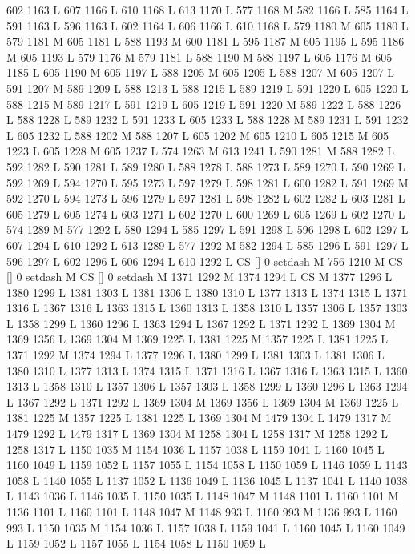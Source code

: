 {{{{{{{{{{{{{{{{{{602 1163 L
607 1166 L
610 1168 L
613 1170 L
577 1168 M 582 1166 L
585 1164 L
591 1163 L
596 1163 L
602 1164 L
606 1166 L
610 1168 L
579 1180 M 605 1180 L
579 1181 M 605 1181 L
588 1193 M 600 1181 L
595 1187 M 605 1195 L
595 1186 M 605 1193 L
579 1176 M 579 1181 L
588 1190 M 588 1197 L
605 1176 M 605 1185 L
605 1190 M 605 1197 L
588 1205 M 605 1205 L
588 1207 M 605 1207 L
591 1207 M 589 1209 L
588 1213 L
588 1215 L
589 1219 L
591 1220 L
605 1220 L
588 1215 M 589 1217 L
591 1219 L
605 1219 L
591 1220 M 589 1222 L
588 1226 L
588 1228 L
589 1232 L
591 1233 L
605 1233 L
588 1228 M 589 1231 L
591 1232 L
605 1232 L
588 1202 M 588 1207 L
605 1202 M 605 1210 L
605 1215 M 605 1223 L
605 1228 M 605 1237 L
574 1263 M 613 1241 L
590 1281 M 588 1282 L
592 1282 L
590 1281 L
589 1280 L
588 1278 L
588 1273 L
589 1270 L
590 1269 L
592 1269 L
594 1270 L
595 1273 L
597 1279 L
598 1281 L
600 1282 L
591 1269 M 592 1270 L
594 1273 L
596 1279 L
597 1281 L
598 1282 L
602 1282 L
603 1281 L
605 1279 L
605 1274 L
603 1271 L
602 1270 L
600 1269 L
605 1269 L
602 1270 L
574 1289 M 577 1292 L
580 1294 L
585 1297 L
591 1298 L
596 1298 L
602 1297 L
607 1294 L
610 1292 L
613 1289 L
577 1292 M 582 1294 L
585 1296 L
591 1297 L
596 1297 L
602 1296 L
606 1294 L
610 1292 L
CS [] 0 setdash M
756 1210 M CS [] 0 setdash M
CS [] 0 setdash M
1371 1292 M 1374 1294 L
CS M
1377 1296 L
1380 1299 L
1381 1303 L
1381 1306 L
1380 1310 L
1377 1313 L
1374 1315 L
1371 1316 L
1367 1316 L
1363 1315 L
1360 1313 L
1358 1310 L
1357 1306 L
1357 1303 L
1358 1299 L
1360 1296 L
1363 1294 L
1367 1292 L
1371 1292 L
1369 1304 M 1369 1356 L
1369 1304 M 1369 1225 L
1381 1225 M 1357 1225 L
1381 1225 L
1371 1292 M 1374 1294 L
1377 1296 L
1380 1299 L
1381 1303 L
1381 1306 L
1380 1310 L
1377 1313 L
1374 1315 L
1371 1316 L
1367 1316 L
1363 1315 L
1360 1313 L
1358 1310 L
1357 1306 L
1357 1303 L
1358 1299 L
1360 1296 L
1363 1294 L
1367 1292 L
1371 1292 L
1369 1304 M 1369 1356 L
1369 1304 M 1369 1225 L
1381 1225 M 1357 1225 L
1381 1225 L
1369 1304 M 1479 1304 L
1479 1317 M 1479 1292 L
1479 1317 L
1369 1304 M 1258 1304 L
1258 1317 M 1258 1292 L
1258 1317 L
1150 1035 M 1154 1036 L
1157 1038 L
1159 1041 L
1160 1045 L
1160 1049 L
1159 1052 L
1157 1055 L
1154 1058 L
1150 1059 L
1146 1059 L
1143 1058 L
1140 1055 L
1137 1052 L
1136 1049 L
1136 1045 L
1137 1041 L
1140 1038 L
1143 1036 L
1146 1035 L
1150 1035 L
1148 1047 M 1148 1101 L
1160 1101 M 1136 1101 L
1160 1101 L
1148 1047 M 1148 993 L
1160 993 M 1136 993 L
1160 993 L
1150 1035 M 1154 1036 L
1157 1038 L
1159 1041 L
1160 1045 L
1160 1049 L
1159 1052 L
1157 1055 L
1154 1058 L
1150 1059 L
}}}}}}}}}}}}}}}}}}
